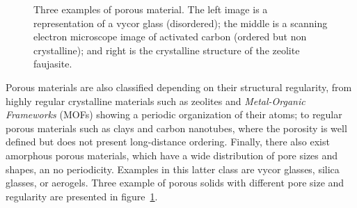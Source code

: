 \documentclass[thesis]{subfiles}
\begin{document}
\begin{figure}[ht]
    \centering
    \hfill
    \hfill
    \caption{Three examples of porous material. The left image is a
    representation of a vycor glass (disordered)\cite{Levitz2003}; the middle
    is a scanning electron microscope image of activated carbon (ordered but non
    crystalline)\cite{Das2015}; and right is the crystalline structure of the
    zeolite faujasite.}
    \label{fig:porous-examples}
\end{figure}

Porous materials are also classified depending on their structural regularity,
from highly regular crystalline materials such as zeolites and
\emph{Metal-Organic Frameworks} (MOFs) showing a periodic organization of their
atoms; to regular porous materials such as clays and carbon nanotubes, where the
porosity is well defined but does not present long-distance ordering. Finally,
there also exist amorphous porous materials, which have a wide distribution of
pore sizes and shapes, an no periodicity. Examples in this latter class are
vycor glasses, silica glasses, or aerogels. Three example of porous solids with
different pore size and regularity are presented in
figure~\ref{fig:porous-examples}.
\end{document}
